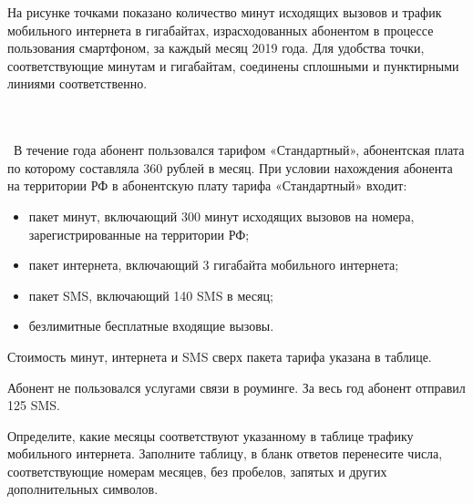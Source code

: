 \begin{class}[number=7]
	\begin{listofex}
		\item[] На рисунке точками показано количество минут исходящих вызовов и трафик мобильного интернета в гигабайтах, израсходованных абонентом в процессе пользования смартфоном, за каждый месяц 2019 года. Для удобства точки, соответствующие минутам и гигабайтам, соединены сплошными и пунктирными линиями соответственно.
		\\\ \begin{figure}[h]
		\end{figure}\\\
		В течение года абонент пользовался тарифом «Стандартный», абонентская плата по которому составляла 360 рублей в месяц. При условии нахождения абонента на территории РФ в абонентскую плату тарифа «Стандартный» входит:
		\begin{itemize}
			\item пакет минут, включающий 300 минут исходящих вызовов на номера, зарегистрированные на территории РФ;
			\item пакет интернета, включающий 3 гигабайта мобильного интернета;
			\item пакет SMS, включающий 140 SMS в месяц;
			\item безлимитные бесплатные входящие вызовы.
		\end{itemize}
		Стоимость минут, интернета и SMS сверх пакета тарифа указана в таблице.
		\newpage
		\begin{figure}[h]
		\end{figure}
		Абонент не пользовался услугами связи в роуминге. За весь год абонент отправил 125 SMS.
		\item Определите, какие месяцы соответствуют указанному в таблице трафику мобильного интернета. Заполните таблицу, в бланк ответов перенесите числа, соответствующие номерам месяцев, без пробелов, запятых и других дополнительных символов.
		\begin{figure}[h]
		\end{figure}
		

\end{listofex}
\end{class}
